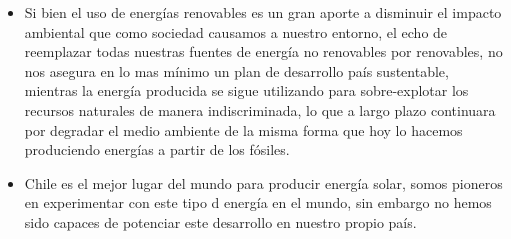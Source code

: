 \begin{itemize}
\item Si bien el uso de energías renovables es un gran aporte a disminuir el impacto ambiental que como sociedad causamos a nuestro entorno, el echo de reemplazar todas nuestras fuentes de energía no renovables por renovables, no nos asegura en lo mas mínimo un plan de desarrollo país sustentable, mientras la energía producida se sigue utilizando para sobre-explotar los recursos naturales de manera indiscriminada, lo que a largo plazo continuara por degradar el medio ambiente de la misma forma que hoy lo hacemos produciendo energías a partir de los fósiles.
\item Chile es el mejor lugar del mundo para producir energía solar, somos pioneros en experimentar con este tipo d energía en el mundo, sin embargo no hemos sido capaces de potenciar este desarrollo en nuestro propio país.
\end{itemize}
